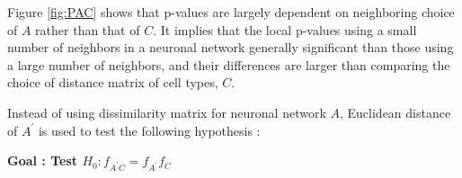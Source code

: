 \documentclass[12pt]{report}
\begin{document}
Figure \ref{fig:PAC} shows that p-values are largely dependent on neighboring choice of $A$ rather than that of $C$. It implies that the local p-values using a small number of neighbors in a neuronal network generally significant than those using a large number of neighbors, and their differences are larger than comparing the choice of distance matrix of cell types, $C$. 




\newpage
Instead of using dissimilarity matrix for neuronal network $A$, Euclidean distance of $A^\prime$ is used to test the following hypothesis : 

\begin{center}\textbf{Goal : Test $H_{0} : f_{A^\prime C} = f_{A^\prime}f_{C}$}
\end{center}  
\end{document}
